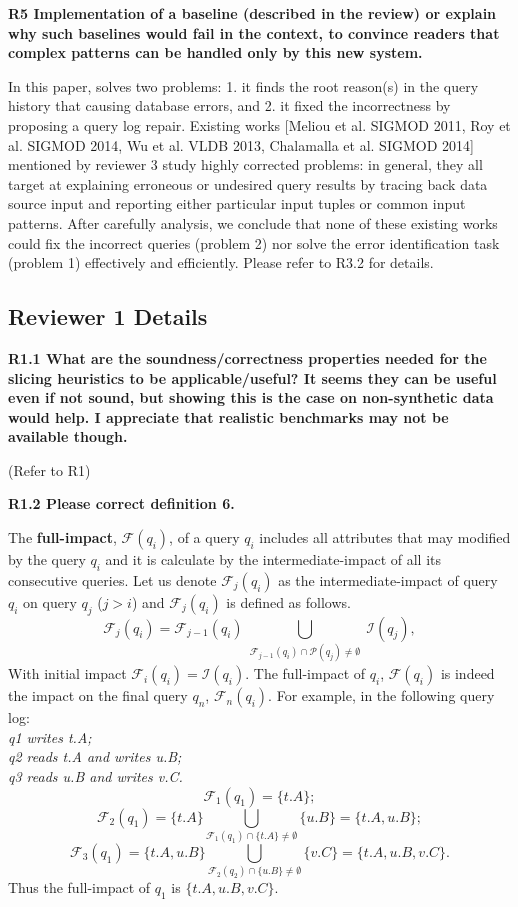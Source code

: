 \noindent \textbf{R5 Implementation of a baseline (described in the review) or explain why such baselines would fail in the context, to convince readers that complex patterns can be handled only by this new system.}

In this paper, \sys solves two problems: 1. it finds the root reason(s) in the query history that causing database errors, and 2. it fixed the incorrectness by proposing a query log repair. Existing works [Meliou et al. SIGMOD 2011, Roy et al. SIGMOD 2014, Wu et al. VLDB 2013, Chalamalla et al. SIGMOD 2014] mentioned by reviewer 3 study highly corrected problems: in general, they all target at explaining erroneous or undesired query results by tracing back data source input and reporting either particular input tuples or common input patterns. After carefully analysis, we conclude that none of these existing works could fix the incorrect queries (problem 2) nor solve the error identification task (problem 1) effectively and efficiently. Please refer to R3.2 for details.


\subsection*{Reviewer 1 Details}
\noindent \textbf{R1.1 What are the soundness/correctness properties needed for the slicing heuristics to be applicable/useful? It seems they can be useful even if not sound, but showing this is the case on non-synthetic data would help. I appreciate that realistic benchmarks may not be available though.}

(Refer to R1)

\noindent \textbf{R1.2 Please correct definition 6.} 

The \textbf{full-impact}, $\mathcal{F}(q_i)$, of a query $q_i$ includes all attributes that may modified by the query $q_i$ and it is calculate by the intermediate-impact of all its consecutive queries. Let us denote $\mathcal{F}_j(q_i)$ as the intermediate-impact of query $q_i$ on query $q_j$ ($j > i$) and $\mathcal{F}_j(q_i)$ is defined as follows.
 \[
    \mathcal{F}_j(q_i)=\mathcal{F}_{j-1}(q_i)\bigcup_{\substack{\mathcal{F}_{j-1}(q_i)\cap \mathcal{P}(q_j) \neq \emptyset}} \mathcal{I}(q_j),
 \]
With initial impact $\mathcal{F}_i(q_i)  = \mathcal{I}(q_i)$. The full-impact of $q_i$, $\mathcal{F}(q_i)$ is indeed the impact on the final query $q_n$, $\mathcal{F}_n(q_i)$. For example, in the following query log:\\
\textit{q1 writes t.A; \\
q2 reads t.A and writes u.B; \\
q3 reads u.B and writes v.C.}\\
\[\mathcal{F}_1(q_1) = \{t.A\};\] 
\[\mathcal{F}_2(q_1) = \{t.A\} \bigcup_{\mathcal{F}_1(q_1) \cap \{t.A\} \neq \emptyset} \{u.B\} = \{t.A, u.B\};\]
\[\mathcal{F}_3(q_1) = \{t.A, u.B\}\bigcup_{\mathcal{F}_2(q_2) \cap \{u.B\} \neq \emptyset} \{v.C\} = \{t.A, u.B, v.C\}.\]
Thus the full-impact of $q_1$ is $\{t.A, u.B, v.C\}$.

